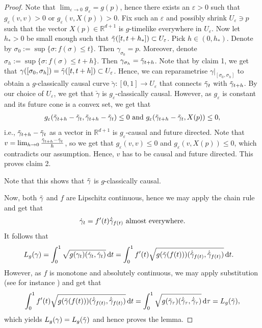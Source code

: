 \documentclass[a4paper,10pt]{article}
\numberwithin{equation}{section}
\newcommand{\R}{\mathbb{R}}
\newcommand{\e}{\varepsilon}
\newcommand{\di}{{\rm d}}
\begin{document}
\begin{proof}
    Note that $\lim_{\e \to 0} g_\e = g(p)$, hence there exists an $\e>0$ such that $g_\e(v,v)>0$ or $g_\e(v, X(p))>0$. Fix such an $\e$ and possibly shrink $U_\e \ni p$ such that the vector $X(p) \in \R^{d+1}$ is $g$-timelike everywhere in $U_\e$.
    Now let $h_* >0$ be small enough such that $\Tilde{\gamma}([t, t+h_*]) \subset U_\e$. Pick $h \in (0, h_*)$.
    Denote by $\sigma_0:= \sup\{\sigma: f(\sigma) \leq t\}$. Then $\gamma_{\sigma_0} = p$. Moreover, denote $\sigma_h:= \sup\{\sigma: f(\sigma) \leq t+h\}$. Then $\gamma_{\sigma_h} = \Tilde{\gamma}_{t+h}$. 
    Note that by claim 1, we get that $\gamma([\sigma_0, \sigma_h]) = \Tilde{\gamma}([t, t+h]) \subset U_\e$. Hence, we can reparametrise $\gamma|_{[\sigma_0, \sigma_h]}$ to obtain a $g$-classically causal curve $\check{\gamma}:[0,1] \to U_\e$ that connects $\Tilde{\gamma}_t$ with $\Tilde{\gamma}_{t+h}$. By our choice of $U_\e$, we get that $\check{\gamma}$ is $g_\e$-classically causal. However, as $g_\e$ is constant and its future cone is a convex set, we get that
    \begin{align*}
        g_\e(\Tilde{\gamma}_{t+h}-\Tilde{\gamma}_t, \Tilde{\gamma}_{t+h}-\Tilde{\gamma}_t) \leq 0 \ \mathrm{and}\ g_\e(\Tilde{\gamma}_{t+h}-\Tilde{\gamma}_t, X(p)) \leq 0,
    \end{align*}
    i.e., $\Tilde{\gamma}_{t+h}-\Tilde{\gamma}_t$ as a vector in $\R^{d+1}$ is $g_\e$-causal and future directed. 
    Note that $v = \lim_{h \to 0} \frac{\Tilde{\gamma}_{t+h}-\Tilde{\gamma}_t}{h}$, so we get that $g_\e(v, v) \leq 0$ and $g_\e(v, X(p)) \leq 0$, which contradicts our assumption. Hence, $v$ has to be causal and future directed. 
    This proves claim 2. 
    
    Note that this shows that $\Tilde{\gamma}$ is  $g$-classically causal.
    
    Now, both $\Tilde{\gamma}$ and $f$ are Lipschitz continuous, hence we may apply the chain rule and get that 
    \begin{align*}
        \dot{\gamma}_{t} = f'(t) \dot{\Tilde{\gamma}}_{f(t)} \ \mathrm{almost\ everywhere}.
    \end{align*}
    It follows that 
    \begin{align*}
        L_g(\gamma) = \int_0^1 \sqrt{g({\gamma}_t)(\dot{{\gamma}}_t, \dot{{\gamma}}_t)} \, \di t &= \int_0^1 f'(t)\sqrt{g(\Tilde{\gamma}(f(t)))(\dot{\Tilde{\gamma}}_{f(t)}, \dot{\Tilde{\gamma}}_{f(t)})} \, \di t.
    \end{align*}
    However, as $f$ is monotone and absolutely continuous, we may apply substitution (see for instance \cite[Theorem 5.42]{leoni2017first}) and get that 
    \begin{align*}
        \int_0^1 f'(t)\sqrt{g(\Tilde{\gamma}(f(t)))(\dot{\Tilde{\gamma}}_{f(t)}, \dot{\Tilde{\gamma}}_{f(t)})} \, \di t = \int_0^1\sqrt{g(\Tilde{\gamma}_\tau)(\dot{\Tilde{\gamma}}_\tau,\dot{\Tilde{\gamma}}_\tau )}\, \di \tau = L_g(\Tilde{\gamma}),
    \end{align*}
    which yields $L_g(\gamma)= L_g(\Tilde{\gamma})$ and hence proves the lemma. 
\end{proof}
\end{document}
